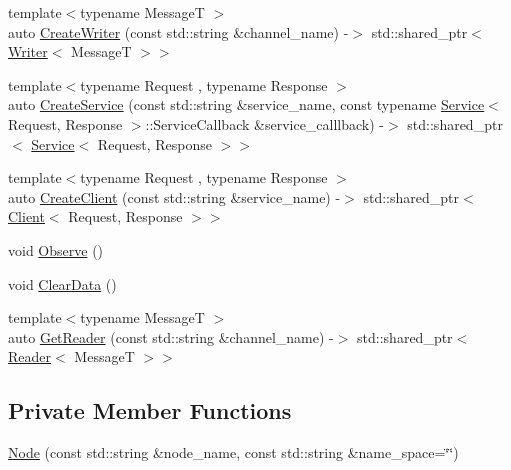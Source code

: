 \begin{DoxyCompactItemize}
\item 
{\footnotesize template$<$typename Message\-T $>$ }\\auto \hyperlink{classapollo_1_1cyber_1_1Node_acb01c315d71730e31fbd7687f99ad664}{Create\-Writer} (const std\-::string \&channel\-\_\-name) -\/$>$ std\-::shared\-\_\-ptr$<$ \hyperlink{classapollo_1_1cyber_1_1Writer}{Writer}$<$ Message\-T $>$$>$
\item 
{\footnotesize template$<$typename Request , typename Response $>$ }\\auto \hyperlink{classapollo_1_1cyber_1_1Node_aaa9b8d603becaf7ef00354f780d0680f}{Create\-Service} (const std\-::string \&service\-\_\-name, const typename \hyperlink{classapollo_1_1cyber_1_1Service}{Service}$<$ Request, Response $>$\-::Service\-Callback \&service\-\_\-calllback) -\/$>$ std\-::shared\-\_\-ptr$<$ \hyperlink{classapollo_1_1cyber_1_1Service}{Service}$<$ Request, Response $>$$>$
\item 
{\footnotesize template$<$typename Request , typename Response $>$ }\\auto \hyperlink{classapollo_1_1cyber_1_1Node_a5686ca1d8eebcb4b75d40aaf4b38cb62}{Create\-Client} (const std\-::string \&service\-\_\-name) -\/$>$ std\-::shared\-\_\-ptr$<$ \hyperlink{classapollo_1_1cyber_1_1Client}{Client}$<$ Request, Response $>$$>$
\item 
void \hyperlink{classapollo_1_1cyber_1_1Node_a4be2b14c6792747f8656dd919d27ab08}{Observe} ()
\item 
void \hyperlink{classapollo_1_1cyber_1_1Node_a0ea323d8977f0bf34ab980aa08abe538}{Clear\-Data} ()
\item 
{\footnotesize template$<$typename Message\-T $>$ }\\auto \hyperlink{classapollo_1_1cyber_1_1Node_ae327333999356195de0643ce21e27ec9}{Get\-Reader} (const std\-::string \&channel\-\_\-name) -\/$>$ std\-::shared\-\_\-ptr$<$ \hyperlink{classapollo_1_1cyber_1_1Reader}{Reader}$<$ Message\-T $>$$>$
\end{DoxyCompactItemize}
\subsection*{Private Member Functions}
\begin{DoxyCompactItemize}
\item 
\hyperlink{classapollo_1_1cyber_1_1Node_abc8fb29c7802cebbcc5af4cc3fec5b5c}{Node} (const std\-::string \&node\-\_\-name, const std\-::string \&name\-\_\-space=\char`\"{}\char`\"{})
\end{DoxyCompactItemize}

